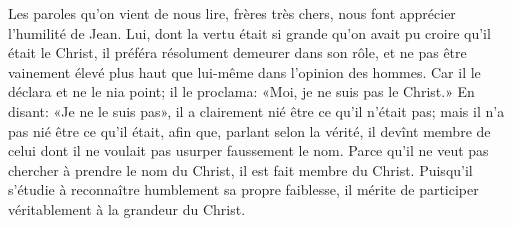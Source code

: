 Les paroles qu’on vient de nous lire, frères très chers,
	nous font apprécier l’humilité de Jean.
Lui, dont la vertu était si grande qu’on avait pu croire qu’il était le Christ,
	il préféra résolument demeurer dans son rôle,
	et ne pas être vainement élevé plus haut que lui-même
		dans l’opinion des hommes.
Car il le déclara et ne le nia point;
	il le proclama: «Moi, je ne suis pas le Christ.»
En disant: «Je ne le suis pas»,
	il a clairement nié être ce qu’il n’était pas;
	mais il n’a pas nié être ce qu’il était,
	afin que, parlant selon la vérité,
	il devînt membre de celui dont il ne voulait pas usurper faussement le nom.
Parce qu’il ne veut pas chercher à prendre le nom du Christ,
	il est fait membre du Christ.
Puisqu’il s’étudie à reconnaître humblement sa propre faiblesse,
	il mérite de participer véritablement à la grandeur du Christ.
